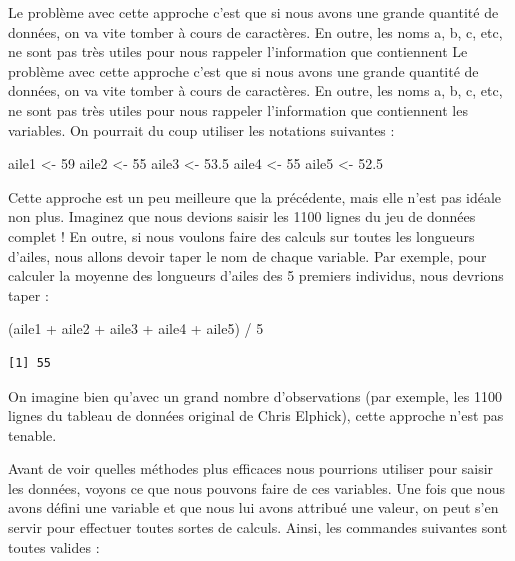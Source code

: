 \documentclass[
  a4paper,
  DIV=11,
  numbers=noendperiod,
  oneside]{scrreprt}
\newenvironment{Shaded}{}{}
\newcommand{\DecValTok}[1]{\textcolor[rgb]{0.00,0.36,0.77}{#1}}
\newcommand{\FloatTok}[1]{\textcolor[rgb]{0.00,0.36,0.77}{#1}}
\newcommand{\NormalTok}[1]{\textcolor[rgb]{0.14,0.16,0.18}{#1}}
\newcommand{\OtherTok}[1]{\textcolor[rgb]{0.44,0.26,0.76}{#1}}
\newcommand{\SpecialCharTok}[1]{\textcolor[rgb]{0.00,0.36,0.77}{#1}}
\begin{document}
Le problème avec cette approche c'est que si nous avons une grande
quantité de données, on va vite tomber à cours de caractères. En outre,
les noms a, b, c, etc, ne sont pas très utiles pour nous rappeler
l'information que contiennent Le problème avec cette approche c'est que
si nous avons une grande quantité de données, on va vite tomber à cours
de caractères. En outre, les noms a, b, c, etc, ne sont pas très utiles
pour nous rappeler l'information que contiennent les variables. On
pourrait du coup utiliser les notations suivantes :

\begin{Shaded}
\begin{Highlighting}[]
\NormalTok{aile1 }\OtherTok{\textless{}{-}} \DecValTok{59}
\NormalTok{aile2 }\OtherTok{\textless{}{-}} \DecValTok{55}
\NormalTok{aile3 }\OtherTok{\textless{}{-}} \FloatTok{53.5}
\NormalTok{aile4 }\OtherTok{\textless{}{-}} \DecValTok{55}
\NormalTok{aile5 }\OtherTok{\textless{}{-}} \FloatTok{52.5}
\end{Highlighting}
\end{Shaded}

Cette approche est un peu meilleure que la précédente, mais elle n'est
pas idéale non plus. Imaginez que nous devions saisir les 1100 lignes du
jeu de données complet ! En outre, si nous voulons faire des calculs sur
toutes les longueurs d'ailes, nous allons devoir taper le nom de chaque
variable. Par exemple, pour calculer la moyenne des longueurs d'ailes
des 5 premiers individus, nous devrions taper :

\begin{Shaded}
\begin{Highlighting}[]
\NormalTok{(aile1 }\SpecialCharTok{+}\NormalTok{ aile2 }\SpecialCharTok{+}\NormalTok{ aile3 }\SpecialCharTok{+}\NormalTok{ aile4 }\SpecialCharTok{+}\NormalTok{ aile5) }\SpecialCharTok{/} \DecValTok{5}
\end{Highlighting}
\end{Shaded}

\begin{verbatim}
[1] 55
\end{verbatim}

On imagine bien qu'avec un grand nombre d'observations (par exemple, les
1100 lignes du tableau de données original de Chris Elphick), cette
approche n'est pas tenable.

Avant de voir quelles méthodes plus efficaces nous pourrions utiliser
pour saisir les données, voyons ce que nous pouvons faire de ces
variables. Une fois que nous avons défini une variable et que nous lui
avons attribué une valeur, on peut s'en servir pour effectuer toutes
sortes de calculs. Ainsi, les commandes suivantes sont toutes valides :
\end{document}
